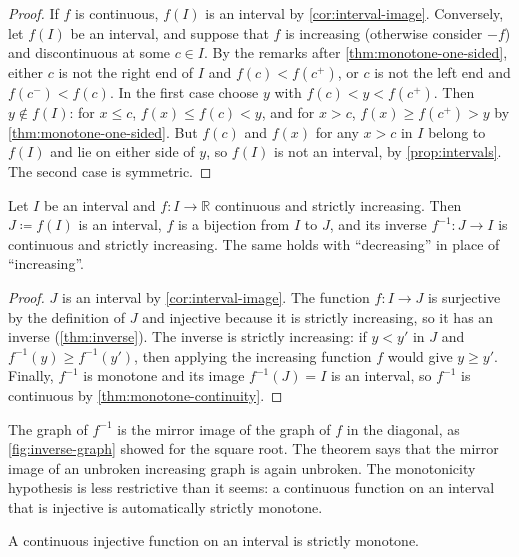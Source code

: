 \begin{proof}
If $f$ is continuous, $f(I)$ is an interval by \cref{cor:interval-image}. Conversely, let $f(I)$ be an interval, and suppose that $f$ is increasing (otherwise consider $-f$) and discontinuous at some $c\in I$. By the remarks after \cref{thm:monotone-one-sided}, either $c$ is not the right end of $I$ and $f(c)<f(c^+)$, or $c$ is not the left end and $f(c^-)<f(c)$. In the first case choose $y$ with $f(c)<y<f(c^+)$. Then $y\notin f(I)$: for $x\le c$, $f(x)\le f(c)<y$, and for $x>c$, $f(x)\ge f(c^+)>y$ by \cref{thm:monotone-one-sided}. But $f(c)$ and $f(x)$ for any $x>c$ in $I$ belong to $f(I)$ and lie on either side of $y$, so $f(I)$ is not an interval, by \cref{prop:intervals}. The second case is symmetric.
\end{proof}

\begin{theorem}
\label{thm:inverse-continuous}
Let $I$ be an interval and $f\colon I\to\mathbb R$ continuous and strictly increasing. Then $J\coloneqq f(I)$ is an interval, $f$ is a bijection from $I$ to $J$, and its inverse $f^{-1}\colon J\to I$ is continuous and strictly increasing. The same holds with ``decreasing'' in place of ``increasing''.
\end{theorem}

\begin{proof}
$J$ is an interval by \cref{cor:interval-image}. The function $f\colon I\to J$ is surjective by the definition of $J$ and injective because it is strictly increasing, so it has an inverse (\cref{thm:inverse}). The inverse is strictly increasing: if $y<y'$ in $J$ and $f^{-1}(y)\ge f^{-1}(y')$, then applying the increasing function $f$ would give $y\ge y'$. Finally, $f^{-1}$ is monotone and its image $f^{-1}(J)=I$ is an interval, so $f^{-1}$ is continuous by \cref{thm:monotone-continuity}.
\end{proof}

The graph of $f^{-1}$ is the mirror image of the graph of $f$ in the diagonal, as \cref{fig:inverse-graph} showed for the square root. The theorem says that the mirror image of an unbroken increasing graph is again unbroken. The monotonicity hypothesis is less restrictive than it seems: a continuous function on an interval that is injective is automatically strictly monotone.

\begin{proposition}
\label{prop:injective-monotone}
A continuous injective function on an interval is strictly monotone.
\end{proposition}


